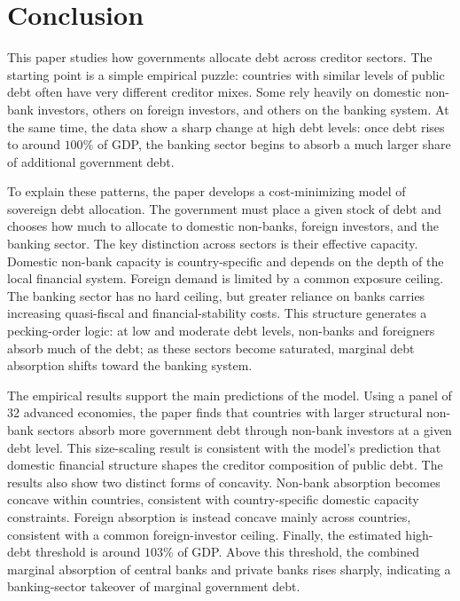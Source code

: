 \documentclass[\latexroot/\projectname]{subfiles}
\begin{document}
\section{Conclusion}\whenintegrated{\label{conclusion}}
\whenintegrated{\label{sec:conclusion}} %

This paper studies how governments allocate debt across creditor sectors.
The starting point is a simple empirical puzzle: countries with similar levels
of public debt often have very different creditor mixes. Some rely heavily on
domestic non-bank investors, others on foreign investors, and others on the
banking system. At the same time, the data show a sharp change at high debt
levels: once debt rises to around $100\%$ of GDP, the banking sector begins to
absorb a much larger share of additional government debt.

To explain these patterns, the paper develops a cost-minimizing model of
sovereign debt allocation. The government must place a given stock of debt and
chooses how much to allocate to domestic non-banks, foreign investors, and the
banking sector. The key distinction across sectors is their effective capacity.
Domestic non-bank capacity is country-specific and depends on the depth of the
local financial system. Foreign demand is limited by a common exposure ceiling.
The banking sector has no hard ceiling, but greater reliance on banks carries
increasing quasi-fiscal and financial-stability costs. This structure generates
a pecking-order logic: at low and moderate debt levels, non-banks and foreigners
absorb much of the debt; as these sectors become saturated, marginal debt
absorption shifts toward the banking system.

The empirical results support the main predictions of the model. Using a panel
of 32 advanced economies, the paper finds that countries with larger structural
non-bank sectors absorb more government debt through non-bank investors at a
given debt level. This size-scaling result is consistent with the model's
prediction that domestic financial structure shapes the creditor composition of
public debt. The results also show two distinct forms of concavity. Non-bank
absorption becomes concave within countries, consistent with country-specific
domestic capacity constraints. Foreign absorption is instead concave mainly
across countries, consistent with a common foreign-investor ceiling. Finally,
the estimated high-debt threshold is around $103\%$ of GDP. Above this threshold,
the combined marginal absorption of central banks and private banks rises
sharply, indicating a banking-sector takeover of marginal government debt.
\end{document}
